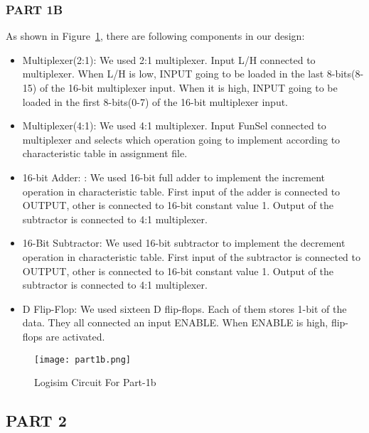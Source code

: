 \documentclass[pdftex,12pt,a4paper]{article}
\begin{document}
\subsubsection{PART 1B}
As shown in Figure~\ref{fig2}, there are following components in our design:
\begin{itemize}
\item Multiplexer(2:1): We used 2:1 multiplexer. Input L/H connected to multiplexer. When L/H is low, INPUT going to be loaded in the last 8-bits(8-15) of the 16-bit multiplexer input. When it is high, INPUT going to be loaded in the first 8-bits(0-7) of the 16-bit multiplexer input. 
\item Multiplexer(4:1): We used 4:1 multiplexer. Input FunSel connected to multiplexer and selects which operation going to implement according to characteristic table in assignment file. 
\item 16-bit Adder: : We used 16-bit full adder to implement the increment operation in characteristic table. First input of the adder is connected to OUTPUT, other is connected to 16-bit constant value 1. Output of the subtractor is connected to 4:1 multiplexer.
\item 16-Bit Subtractor: We used 16-bit subtractor to implement the decrement operation in characteristic table. First input of the subtractor is connected to OUTPUT, other is connected to 16-bit constant value 1. Output of the subtractor is connected to 4:1 multiplexer.
\item D Flip-Flop: We used sixteen D flip-flops. Each of them stores 1-bit of the data. They all connected an input ENABLE. When ENABLE is high, flip-flops are activated.

\end{itemize}

\begin{figure}[H]
	\centering
	\texttt{[image: part1b.png]}	
	\caption{Logisim Circuit For Part-1b}
	\label{fig2}
\end{figure}


\subsection{PART 2}
\end{document}
